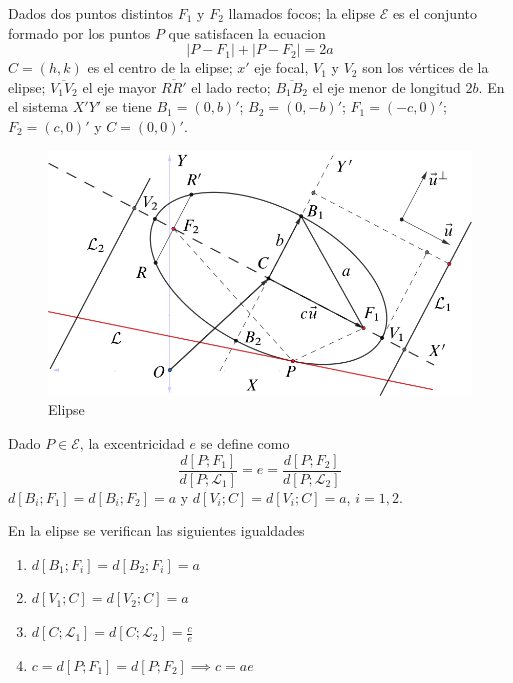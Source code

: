 \documentclass[10pt,]{krantz}
\let\oldincludegraphics\includegraphics
\renewcommand\includegraphics[2][]{%
  \oldincludegraphics[scale=0.85]{#2}
}
\theoremstyle{definition}
\theoremstyle{definition}
\theoremstyle{definition}
\theoremstyle{remark}
\let\BeginKnitrBlock\begin \let\EndKnitrBlock\end
\begin{document}
Dados dos puntos distintos \(F_1\) y \(F_2\) llamados focos; la elipse \(\mathcal{E}\) es el conjunto formado por los puntos \(P\) que satisfacen la ecuacion
\begin{equation} 
\left|P-F_1\right|+\left|P-F_2\right|=2a
\label{eq:binom}
\end{equation}
\(C=(h,k)\) es el centro de la elipse; \(x'\) eje focal, \(V_1\) y \(V_2\) son los vértices de la elipse; \(\overline{V_1V_2}\) el eje mayor \(\overline{RR'}\) el lado recto; \(\overline{B_1B_2}\) el eje menor de longitud \(2b\). En el sistema \(X'Y'\) se tiene \(B_1=(0,b)'\); \(B_2=(0,-b)'\); \(F_1=(-c,0)'\); \(F_2=(c,0)'\) y \(C=(0,0)'\).

\begin{figure}

{\centering \includegraphics{elipse} 

}

\caption{Elipse}\label{fig:pressure1}
\end{figure}

Dado \(P\in \mathcal{E}\), la excentricidad \(e\) se define como
\begin{equation}
\frac{d\left[P;F_1\right]}{d\left[P;\mathcal{L}_1\right]}=e=\frac{d\left[P;F_2\right]}{d\left[P;\mathcal{L}_2\right]}
\label{eq:ww}
\end{equation}
\(d\left[B_i;F_1\right]=d\left[B_i;F_2\right]= a\) y \(d\left[V_i;C\right]=d\left[V_i;C\right]=a\), \(i=1,2\).

\BeginKnitrBlock{theorem}
\protect\hypertarget{thm:unnamed-chunk-8}{}{\label{thm:unnamed-chunk-8} }En la elipse se verifican las siguientes igualdades

\begin{enumerate}
\def\labelenumi{\arabic{enumi}.}
\item
  \(d\left[B_1;F_i\right]=d\left[B_2;F_i\right]=a\)
\item
  \(d\left[V_1;C\right]=d\left[V_2;C\right]=a\)
\item
  \(d\left[C;\mathcal{L}_1\right]=d\left[C;\mathcal{L}_2\right]=\frac{c}{e}\)
\item
  \(c=d\left[P;F_1\right]=d\left[P;F_2\right]\implies c=ae\)
\end{enumerate}
\EndKnitrBlock{theorem}
\end{document}
